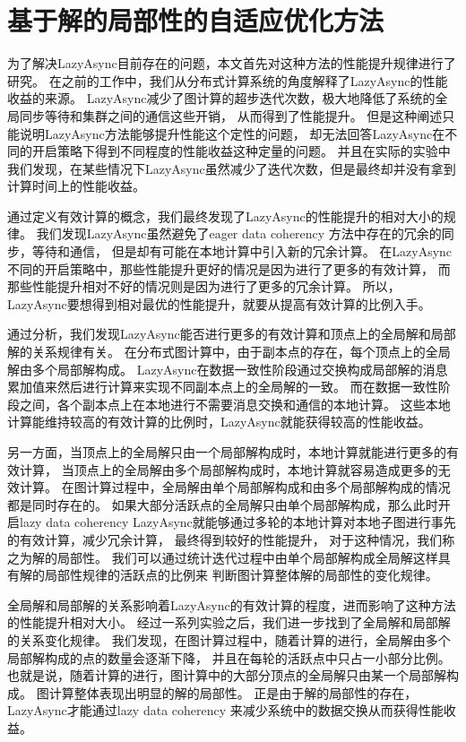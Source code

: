 \section{基于解的局部性的自适应优化方法}
为了解决LazyAsync目前存在的问题，本文首先对这种方法的性能提升规律进行了研究。
在之前的工作中，我们从分布式计算系统的角度解释了LazyAsync的性能收益的来源。
LazyAsync减少了图计算的超步迭代次数，极大地降低了系统的全局同步等待和集群之间的通信这些开销，
从而得到了性能提升。
但是这种阐述只能说明LazyAsync方法能够提升性能这个定性的问题，
却无法回答LazyAsync在不同的开启策略下得到不同程度的性能收益这种定量的问题。
并且在实际的实验中我们发现，在某些情况下LazyAsync虽然减少了迭代次数，但是最终却并没有拿到计算时间上的性能收益。

通过定义有效计算的概念，我们最终发现了LazyAsync的性能提升的相对大小的规律。
我们发现LazyAsync虽然避免了eager data coherency 方法中存在的冗余的同步，等待和通信，
但是却有可能在本地计算中引入新的冗余计算。
在LazyAsync不同的开启策略中，那些性能提升更好的情况是因为进行了更多的有效计算，
而那些性能提升相对不好的情况则是因为进行了更多的冗余计算。
所以，LazyAsync要想得到相对最优的性能提升，就要从提高有效计算的比例入手。


通过分析，我们发现LazyAsync能否进行更多的有效计算和顶点上的全局解和局部解的关系规律有关。
在分布式图计算中，由于副本点的存在，每个顶点上的全局解由多个局部解构成。
LazyAsync在数据一致性阶段通过交换构成局部解的消息累加值来然后进行计算来实现不同副本点上的全局解的一致。
而在数据一致性阶段之间，各个副本点上在本地进行不需要消息交换和通信的本地计算。
这些本地计算能维持较高的有效计算的比例时，LazyAsync就能获得较高的性能收益。

另一方面，当顶点上的全局解只由一个局部解构成时，本地计算就能进行更多的有效计算，
当顶点上的全局解由多个局部解构成时，本地计算就容易造成更多的无效计算。
在图计算过程中，全局解由单个局部解构成和由多个局部解构成的情况都是同时存在的。
如果大部分活跃点的全局解只由单个局部解构成，那么此时开启lazy data coherency 
LazyAsync就能够通过多轮的本地计算对本地子图进行事先的有效计算，减少冗余计算，
最终得到较好的性能提升，
对于这种情况，我们称之为解的局部性。
我们可以通过统计迭代过程中由单个局部解构成全局解这样具有解的局部性规律的活跃点的比例来
判断图计算整体解的局部性的变化规律。



全局解和局部解的关系影响着LazyAsync的有效计算的程度，进而影响了这种方法的性能提升相对大小。
经过一系列实验之后，我们进一步找到了全局解和局部解的关系变化规律。
我们发现，在图计算过程中，随着计算的进行，全局解由多个局部解构成的点的数量会逐渐下降，
并且在每轮的活跃点中只占一小部分比例。
也就是说，随着计算的进行，图计算中的大部分顶点的全局解只由某一个局部解构成。
图计算整体表现出明显的解的局部性。
正是由于解的局部性的存在，LazyAsync才能通过lazy data coherency 来减少系统中的数据交换从而获得性能收益。


